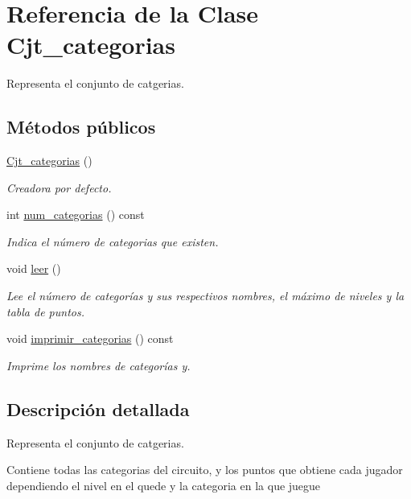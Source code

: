 \hypertarget{class_cjt__categorias}{}\section{Referencia de la Clase Cjt\+\_\+categorias}
\label{class_cjt__categorias}


Representa el conjunto de catgerias.  


\subsection*{Métodos públicos}
\begin{DoxyCompactItemize}
\item 
\hyperlink{class_cjt__categorias_acb1bba449ac618047f1ac5f9f7756ec1}{Cjt\+\_\+categorias} ()
\begin{DoxyCompactList}\small\item\em Creadora por defecto. \end{DoxyCompactList}\item 
int \hyperlink{class_cjt__categorias_a8d99bf913eb3aaf562e5a086faaae517}{num\+\_\+categorias} () const
\begin{DoxyCompactList}\small\item\em Indica el número de categorias que existen. \end{DoxyCompactList}\item 
void \hyperlink{class_cjt__categorias_a25f0264b46b1c1de5af074bfae1ee5ed}{leer} ()
\begin{DoxyCompactList}\small\item\em Lee el número de categorías y sus respectivos nombres, el máximo de niveles y la tabla de puntos. \end{DoxyCompactList}\item 
void \hyperlink{class_cjt__categorias_acd18a2fe2b4336dd5faa7e418962d713}{imprimir\+\_\+categorias} () const
\begin{DoxyCompactList}\small\item\em Imprime los nombres de categorías y. \end{DoxyCompactList}\end{DoxyCompactItemize}


\subsection{Descripción detallada}
Representa el conjunto de catgerias. 

Contiene todas las categorias del circuito, y los puntos que obtiene cada jugador dependiendo el nivel en el quede y la categoria en la que juegue 

